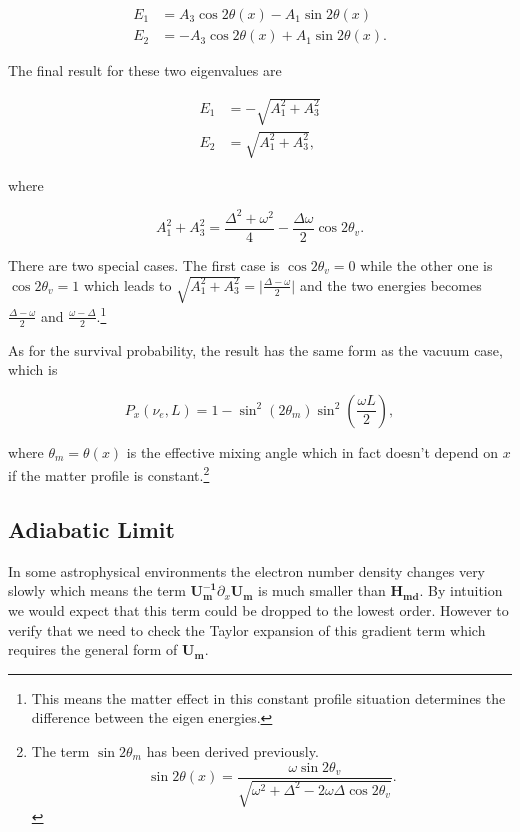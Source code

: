 \documentclass{tufte-handout}
\begin{document}
\begin{align*}
 E_1 &= A_3\cos 2\theta(x) - A_1 \sin 2\theta(x) \\ 
 E_2 & = - A_3 \cos 2\theta(x) + A_1 \sin 2\theta(x) .
\end{align*}

The final result for these two eigenvalues are

\begin{align*}
E_1 &= -\sqrt{A_1^2 + A_3^2} \\
E_2 &= \sqrt{A_1^2 + A_3^2},
\end{align*}

where

\begin{equation*}
A_1^2 + A_3^2 = \frac{\Delta^2 + \omega^2 }{4} - \frac{\Delta \omega }{2} \cos 2\theta_v.
\end{equation*}


There are two special cases. The first case is $\cos 2\theta_v=0$ while the other one is $\cos 2\theta_v = 1$ which leads to $\sqrt{A_1^2+A_3^2} = \lvert\frac{\Delta - \omega}{2} \rvert$ and the two energies becomes $\frac{\Delta - \omega}{2}$ and $\frac{\omega - \Delta}{2} $.\footnote{This means the matter effect in this constant profile situation determines the difference between the eigen energies.}


As for the survival probability, the result has the same form as the vacuum case, which is

\begin{equation*}
P_x(\nu_e,L) = 1 - \sin^2(2\theta_m)\sin^2\left( \frac{\omega L}{2} \right) ,
\end{equation*}

where $\theta_m = \theta(x)$ is the effective mixing angle which in fact doesn't depend on $x$ if the matter profile is constant.\footnote{The term $\sin 2\theta_m$ has been derived previously.
\begin{equation*}
\sin 2\theta(x)  = \frac{\omega\sin 2\theta_v}{\sqrt{ \omega^2+\Delta^2 - 2 \omega \Delta\cos 2\theta_v }}.
\end{equation*}
}








\subsection{Adiabatic Limit}



In some astrophysical environments the electron number density changes very slowly which means the term $\mathbf{U_m^{-1}} \partial_x \mathbf{U_m} $ is much smaller than $\mathbf{H_{md}}$. By intuition we would expect that this term could be dropped to the lowest order. However to verify that we need to check the Taylor expansion of this gradient term which requires the general form of $\mathbf{U_m}$.
\end{document}
